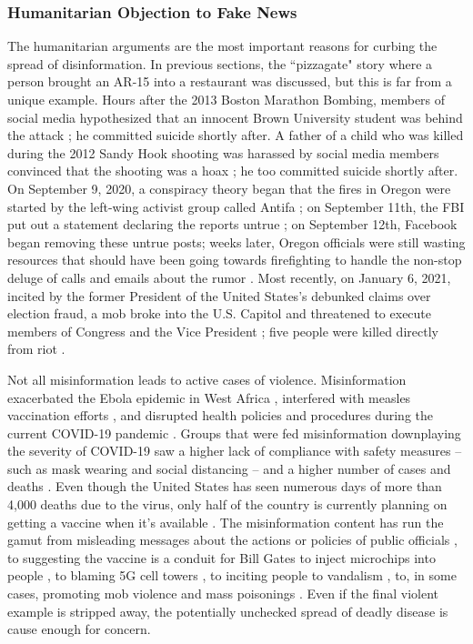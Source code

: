 \documentclass[preprint,review,12pt]{elsarticle}
\begin{document}
\subsubsection{Humanitarian Objection to Fake News}
\label{Humanitarian Objection to Fake News Section}
The humanitarian arguments are the most important reasons for curbing the spread of disinformation. In previous sections, the ``pizzagate" story where a person brought an AR-15 into a restaurant was discussed, but this is far from a unique example. Hours after the 2013 Boston Marathon Bombing, members of social media hypothesized that an innocent Brown University student was behind the attack \cite{starbird2014rumors}; he committed suicide shortly after. A father of a child who was killed during the 2012 Sandy Hook shooting was harassed by social media members convinced that the shooting was a hoax \cite{williamson2019alex}; he too committed suicide shortly after. On September 9, 2020, a conspiracy theory began that the fires in Oregon were started by the left-wing activist group called Antifa \cite{robinson2020oregon}; on September 11th, the FBI put out a statement declaring the reports untrue \cite{fbi2020portland}; on September 12th, Facebook began removing these untrue posts; weeks later, Oregon officials were still wasting resources that should have been going towards firefighting to handle the non-stop deluge of calls and emails about the rumor \cite{wilson2020oregon}. Most recently, on January 6, 2021, incited by the former President of the United States's debunked claims over election fraud, a mob broke into the U.S. Capitol and threatened to execute members of Congress and the Vice President \cite{fandos2021trump}; five people were killed directly from riot \cite{Levenson2021capitol}.

Not all misinformation leads to active cases of violence. Misinformation exacerbated the Ebola epidemic in West Africa \cite{shultz2016role}, interfered with measles vaccination efforts \cite{hussain2018anti}, and disrupted health policies and procedures during the current COVID-19 pandemic \cite{bagherpour2020covid,world2020novel,zarocostas2020fight,depoux2020pandemic,habersaat2020ten,van2020using}. Groups that were fed misinformation downplaying the severity of COVID-19 saw a higher lack of compliance with safety measures -- such as mask wearing and social distancing -- and a higher number of cases and deaths \cite{bursztyn2020misinformation}. Even though the United States has seen numerous days of more than 4,000 deaths due to the virus, only half of the country is currently planning on getting a vaccine when it's available \cite{cornwall2020just}. The misinformation content has run the gamut from misleading messages about the actions or policies of public officials \cite{brennen2020types}, to suggesting the vaccine is a conduit for Bill Gates to inject microchips into people \cite{sanders2020difference}, to blaming 5G cell towers \cite{jolley2020pylons,goodman2020coronavirus}, to inciting people to vandalism \cite{spring2020coronavirus}, to, in some cases, promoting mob violence and mass poisonings \cite{depoux2020pandemic}. Even if the final violent example is stripped away, the potentially unchecked spread of deadly disease is cause enough for concern. 
\end{document}
